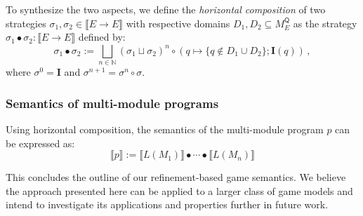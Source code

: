 \documentclass[format=sigplan,authordraft]{acmart}
\newcommand{\kw}[1]{\ensuremath{ \mathsf{#1} }}
\begin{document}
To synthesize the two aspects,
we define the \emph{horizontal composition}
of two strategies $\sigma_1, \sigma_2 \in \llbracket E \rightarrow E \rrbracket$
with respective domains $D_1, D_2 \subseteq M_E^\kw{Q}$
as the strategy $\sigma_1 \bullet \sigma_2 : \llbracket E \rightarrow E
\rrbracket$ defined by:
\[
    \sigma_1 \bullet \sigma_2 :=
      \bigsqcup_{n \in \mathbb{N}} (\sigma_1 \sqcup \sigma_2)^n \circ
        (q \mapsto \{ q \notin D_1 \cup D_2 \} ; \mathbf{I}(q))
 \,,
\]
where $\sigma^0 = \mathbf{I}$ and $\sigma^{n+1} = \sigma^n \circ
\sigma$.

\subsubsection{Semantics of multi-module programs}

Using horizontal composition,
the semantics of the multi-module program $p$
can be expressed as:
\[
    \llbracket p \rrbracket :=
    \llbracket L(M_1) \rrbracket \bullet \cdots \bullet
    \llbracket L(M_n) \rrbracket
\]

This concludes the outline of our refinement-based game semantics.
We believe the approach presented here can be applied to a larger class
of game models and intend to investigate its applications
and properties further in future work.

\end{document}
